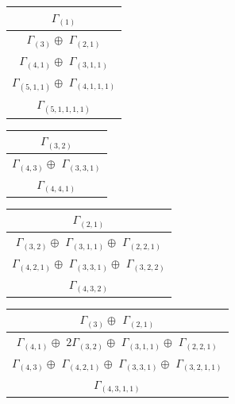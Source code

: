 \documentclass[main.tex]{subfiles}
\begin{document}
\begin{minipage}{.3\textwidth}
\centering
\begin{tabular}{c}
$\Gamma_{(
1
)}$
\\ \hline
$\Gamma_{(
3
)} \oplus$
$\Gamma_{(
2 , 
1
)}$
\\ \hline
$\Gamma_{(
4 , 
1
)} \oplus$
$\Gamma_{(
3 , 
1 , 
1
)}$
\\ \hline
$\Gamma_{(
5 , 
1 , 
1
)} \oplus$
$\Gamma_{(
4 , 
1 , 
1 , 
1
)}$
\\ \hline
$\Gamma_{(
5 , 
1 , 
1 , 
1 , 
1
)}$
\\
\end{tabular}\end{minipage}
\bigskip
\begin{minipage}{.3\textwidth}
\centering
\begin{tabular}{c}
$\Gamma_{(
3 , 
2
)}$
\\ \hline
$\Gamma_{(
4 , 
3
)} \oplus$
$\Gamma_{(
3 , 
3 , 
1
)}$
\\ \hline
$\Gamma_{(
4 , 
4 , 
1
)}$
\\
\end{tabular}\end{minipage}
\begin{minipage}{.3\textwidth}
\centering
\begin{tabular}{c}
$\Gamma_{(
2 , 
1
)}$
\\ \hline
$\Gamma_{(
3 , 
2
)} \oplus$
$\Gamma_{(
3 , 
1 , 
1
)} \oplus$
$\Gamma_{(
2 , 
2 , 
1
)}$
\\ \hline
$\Gamma_{(
4 , 
2 , 
1
)} \oplus$
$\Gamma_{(
3 , 
3 , 
1
)} \oplus$
$\Gamma_{(
3 , 
2 , 
2
)}$
\\ \hline
$\Gamma_{(
4 , 
3 , 
2
)}$
\\
\end{tabular}\end{minipage}
\begin{minipage}{.4\textwidth}
\centering
\begin{tabular}{c}
$\Gamma_{(
3
)} \oplus$
$\Gamma_{(
2 , 
1
)}$
\\ \hline
$\Gamma_{(
4 , 
1
)} \oplus$
$2\Gamma_{(
3 , 
2
)} \oplus$
$\Gamma_{(
3 , 
1 , 
1
)} \oplus$
$\Gamma_{(
2 , 
2 , 
1
)}$
\\ \hline
$\Gamma_{(
4 , 
3
)} \oplus$
$\Gamma_{(
4 , 
2 , 
1
)} \oplus$
$\Gamma_{(
3 , 
3 , 
1
)} \oplus$
$\Gamma_{(
3 , 
2 , 
1 , 
1
)}$
\\ \hline
$\Gamma_{(
4 , 
3 , 
1 , 
1
)}$
\\
\end{tabular}\end{minipage}
\end{document}
